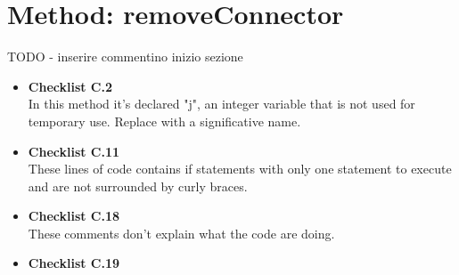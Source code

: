 \documentclass[../../../../codeInspection.tex]{subfiles}
\begin{document}
	\section{Method: removeConnector}

		TODO - inserire commentino inizio sezione

		\begin{itemize}

			\item \textbf{Checklist C.2} \\

				  In this method it's declared "j", an integer variable that is not used for temporary use. Replace with a significative name.

			\item \textbf{Checklist C.11} \\

				  

				  

				  These lines of code contains if statements with only one statement to execute and are not surrounded by curly braces.

		    \item \textbf{Checklist C.18} \\

		    	  

		    	  

		    	  

		    	  

		    	  

		    	  

		    	  These comments don't explain what the code are doing.

		    \item \textbf{Checklist C.19} \\


\end{itemize}
\end{document}
